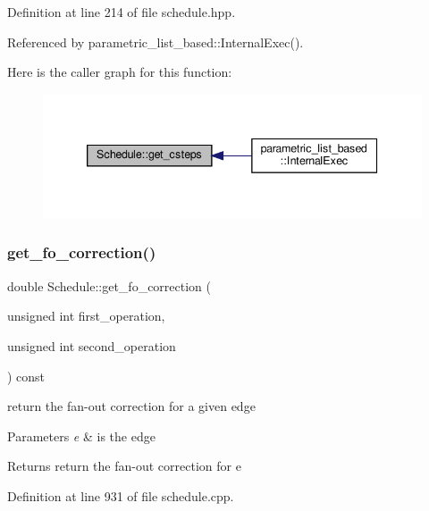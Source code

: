 Definition at line 214 of file schedule.\+hpp.



Referenced by parametric\+\_\+list\+\_\+based\+::\+Internal\+Exec().

Here is the caller graph for this function\+:
\nopagebreak
\begin{figure}[H]
\begin{center}
\leavevmode
\includegraphics[width=339pt]{df/d61/classSchedule_a698a0718e0f7097c70a85d90d1f56e97_icgraph}
\end{center}
\end{figure}
\mbox{\label{classSchedule_a3c418e4bcd41ae0e8b88c117d377f227}} 
\subsubsection{\texorpdfstring{get\+\_\+fo\+\_\+correction()}{get\_fo\_correction()}}
{\footnotesize\ttfamily double Schedule\+::get\+\_\+fo\+\_\+correction (\begin{DoxyParamCaption}\item[{unsigned int}]{first\+\_\+operation,  }\item[{unsigned int}]{second\+\_\+operation }\end{DoxyParamCaption}) const}



return the fan-\/out correction for a given edge 


\begin{DoxyParams}{Parameters}
{\em e} & is the edge \\
\hline
\end{DoxyParams}
\begin{DoxyReturn}{Returns}
return the fan-\/out correction for e 
\end{DoxyReturn}


Definition at line 931 of file schedule.\+cpp.



